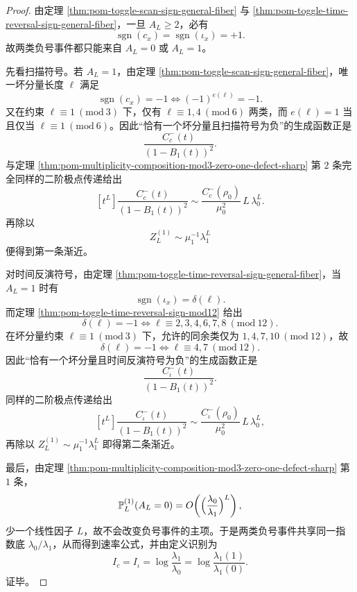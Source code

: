 \begin{proof}
由定理 \ref{thm:pom-toggle-scan-sign-general-fiber} 与 \ref{thm:pom-toggle-time-reversal-sign-general-fiber}，一旦 \(A_L\ge 2\)，必有
\[
\operatorname{sgn}(c_x)=\operatorname{sgn}(\iota_x)=+1.
\]
故两类负号事件都只能来自 \(A_L=0\) 或 \(A_L=1\)。

先看扫描符号。若 \(A_L=1\)，由定理 \ref{thm:pom-toggle-scan-sign-general-fiber}，唯一坏分量长度 \(\ell\) 满足
\[
\operatorname{sgn}(c_x)=-1
\iff
(-1)^{e(\ell)}=-1.
\]
又在约束 \(\ell\equiv 1\ (\mathrm{mod}\ 3)\) 下，仅有 \(\ell\equiv 1,4\ (\mathrm{mod}\ 6)\) 两类，而 \(e(\ell)=1\) 当且仅当 \(\ell\equiv 1\ (\mathrm{mod}\ 6)\)。因此“恰有一个坏分量且扫描符号为负”的生成函数正是
\[
\frac{C_c^-(t)}{(1-B_1(t))^2}.
\]
与定理 \ref{thm:pom-multiplicity-composition-mod3-zero-one-defect-sharp} 第 \(2\) 条完全同样的二阶极点传递给出
\[
[t^L]\frac{C_c^-(t)}{(1-B_1(t))^2}
\sim
\frac{C_c^-(\rho_0)}{\mu_0^2}\,L\,\lambda_0^L.
\]
再除以
\[
Z_L^{(1)}\sim \mu_1^{-1}\lambda_1^L
\]
便得到第一条渐近。

对时间反演符号，由定理 \ref{thm:pom-toggle-time-reversal-sign-general-fiber}，当 \(A_L=1\) 时有
\[
\operatorname{sgn}(\iota_x)=\delta(\ell).
\]
而定理 \ref{thm:pom-toggle-time-reversal-sign-mod12} 给出
\[
\delta(\ell)=-1
\iff
\ell\equiv 2,3,4,6,7,8\ (\mathrm{mod}\ 12).
\]
在坏分量约束 \(\ell\equiv 1\ (\mathrm{mod}\ 3)\) 下，允许的同余类仅为 \(1,4,7,10\ (\mathrm{mod}\ 12)\)，故
\[
\delta(\ell)=-1
\iff
\ell\equiv 4,7\ (\mathrm{mod}\ 12).
\]
因此“恰有一个坏分量且时间反演符号为负”的生成函数正是
\[
\frac{C_\iota^-(t)}{(1-B_1(t))^2}.
\]
同样的二阶极点传递给出
\[
[t^L]\frac{C_\iota^-(t)}{(1-B_1(t))^2}
\sim
\frac{C_\iota^-(\rho_0)}{\mu_0^2}\,L\,\lambda_0^L,
\]
再除以 \(Z_L^{(1)}\sim \mu_1^{-1}\lambda_1^L\) 即得第二条渐近。

最后，由定理 \ref{thm:pom-multiplicity-composition-mod3-zero-one-defect-sharp} 第 \(1\) 条，
\[
\mathbb P_L^{(1)}(A_L=0)=O\!\left(\Bigl(\frac{\lambda_0}{\lambda_1}\Bigr)^L\right),
\]
少一个线性因子 \(L\)，故不会改变负号事件的主项。于是两类负号事件共享同一指数底 \(\lambda_0/\lambda_1\)，从而得到速率公式，并由定义识别为
\[
I_c=I_\iota=\log\frac{\lambda_1}{\lambda_0}
=
\log\frac{\lambda_1(1)}{\lambda_1(0)}.
\]
证毕。
\end{proof}

